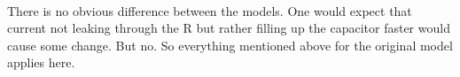 \documentclass[11pt]{article}
\begin{document}
    \begin{center}
    \end{center}
    { \hspace*{\fill} \\}
    
    There is no obvious difference between the models. One would expect that
current not leaking through the R but rather filling up the capacitor
faster would cause some change. But no. So everything mentioned above
for the original model applies here.


    
    
    
\end{document}
